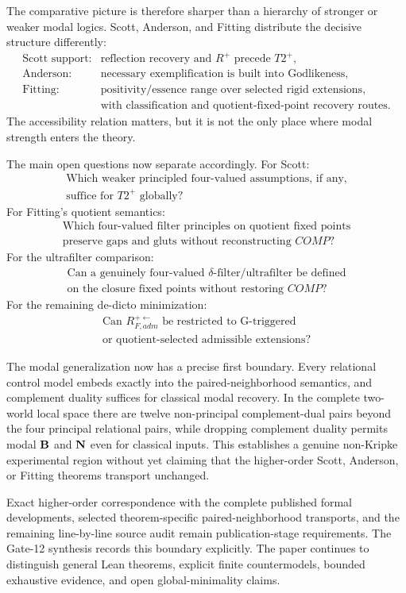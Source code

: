 The comparative picture is therefore sharper than a hierarchy of stronger or weaker modal logics. Scott, Anderson, and Fitting distribute the decisive structure differently:
\[
\begin{array}{ll}
\text{Scott support:} & \text{reflection recovery and }R^+\text{ precede }T2^+,\\
\text{Anderson:} & \text{necessary exemplification is built into Godlikeness},\\
\text{Fitting:} & \text{positivity/essence range over selected rigid extensions,}\\
& \text{with classification and quotient-fixed-point recovery routes.}
\end{array}
\]
The accessibility relation matters, but it is not the only place where modal strength enters the theory.

The main open questions now separate accordingly. For Scott:
\[
  \boxed{
  \begin{gathered}
  \text{Which weaker principled four-valued assumptions, if any,}\\
  \text{suffice for }T2^+\text{ globally?}
  \end{gathered}
  }
\]
For Fitting's quotient semantics:
\[
  \boxed{
  \begin{gathered}
  \text{Which four-valued filter principles on quotient fixed points}\\
  \text{preserve gaps and gluts without reconstructing }COMP\text{?}
  \end{gathered}
  }
\]
For the ultrafilter comparison:
\[
  \boxed{
  \begin{gathered}
  \text{Can a genuinely four-valued }\delta\text{-filter/ultrafilter be defined}\\
  \text{on the closure fixed points without restoring }COMP\text{?}
  \end{gathered}
  }
\]
For the remaining de-dicto minimization:
\[
  \boxed{
  \begin{gathered}
  \text{Can }R_{F,adm}^{+\leftarrow}\text{ be restricted to G-triggered}\\
  \text{or quotient-selected admissible extensions?}
  \end{gathered}
  }
\]

The modal generalization now has a precise first boundary. Every relational control model embeds exactly into the paired-neighborhood semantics, and complement duality suffices for classical modal recovery. In the complete two-world local space there are twelve non-principal complement-dual pairs beyond the four principal relational pairs, while dropping complement duality permits modal \(\mathbf{B}\) and \(\mathbf{N}\) even for classical inputs. This establishes a genuine non-Kripke experimental region without yet claiming that the higher-order Scott, Anderson, or Fitting theorems transport unchanged.

Exact higher-order correspondence with the complete published formal developments, selected theorem-specific paired-neighborhood transports, and the remaining line-by-line source audit remain publication-stage requirements. The Gate-12 synthesis records this boundary explicitly. The paper continues to distinguish general Lean theorems, explicit finite countermodels, bounded exhaustive evidence, and open global-minimality claims.
